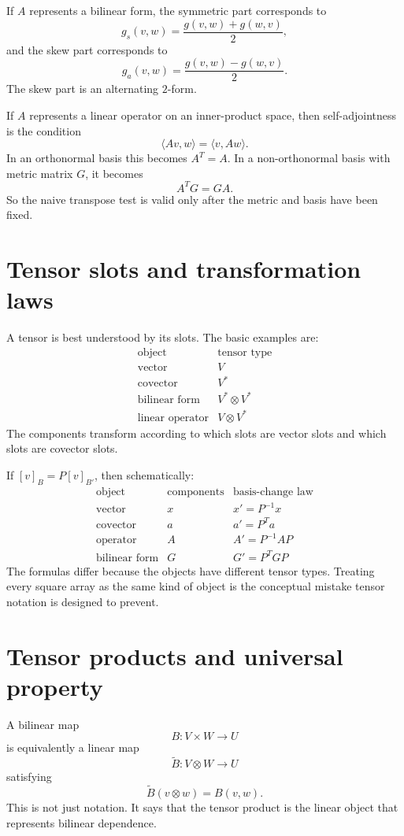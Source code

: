 If \(A\) represents a bilinear form, the symmetric part corresponds to
\[
  g_s(v,w)=\frac{g(v,w)+g(w,v)}{2},
\]
and the skew part corresponds to
\[
  g_a(v,w)=\frac{g(v,w)-g(w,v)}{2}.
\]
The skew part is an alternating \(2\)-form.

If \(A\) represents a linear operator on an inner-product space, then self-adjointness is the condition
\[
  \langle Av,w\rangle=\langle v,Aw\rangle.
\]
In an orthonormal basis this becomes \(A^T=A\).  In a non-orthonormal basis with metric matrix \(G\), it becomes
\[
  A^T G=G A.
\]
So the naive transpose test is valid only after the metric and basis have been fixed.

\section{Tensor slots and transformation laws}

A tensor is best understood by its slots.  The basic examples are:
\[
\begin{array}{c|c}
\text{object} & \text{tensor type}\\
\hline
\text{vector} & V\\
\text{covector} & V^*\\
\text{bilinear form} & V^*\otimes V^*\\
\text{linear operator} & V\otimes V^*
\end{array}
\]
The components transform according to which slots are vector slots and which slots are covector slots.

If \([v]_B=P[v]_{B'}\), then schematically:
\[
\begin{array}{c|c|c}
\text{object} & \text{components} & \text{basis-change law}\\
\hline
\text{vector} & x & x'=P^{-1}x\\
\text{covector} & a & a'=P^Ta\\
\text{operator} & A & A'=P^{-1}AP\\
\text{bilinear form} & G & G'=P^TGP
\end{array}
\]
The formulas differ because the objects have different tensor types.  Treating every square array as the same kind of object is the conceptual mistake tensor notation is designed to prevent.

\section{Tensor products and universal property}

A bilinear map
\[
  B:V\times W\to U
\]
is equivalently a linear map
\[
  \widetilde B:V\otimes W\to U
\]
satisfying
\[
  \widetilde B(v\otimes w)=B(v,w).
\]
This is not just notation.  It says that the tensor product is the linear object that represents bilinear dependence.

